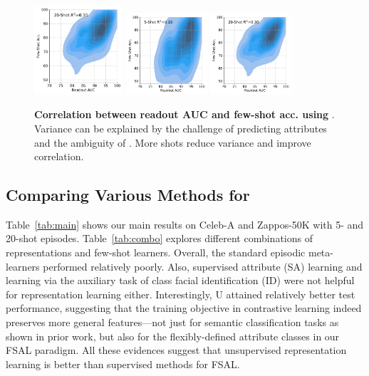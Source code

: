 \begin{figure}[t]
\begin{minipage}[b]{0.49\textwidth}
\quad
\includegraphics[height=3.3cm]{figures/test-s20.pdf}
\else
\includegraphics[height=3.0cm]{figures/test-s5.pdf}
\quad
\includegraphics[height=3.0cm]{figures/test-s20.pdf}
\fi
\vspace{-0.08in}\savespacebeforesection
\caption{\textbf{Correlation between readout AUC and few-shot acc. using \uftsa}. Variance can be explained by the challenge of predicting attributes
and the ambiguity of \taskname{}. More shots reduce variance and improve correlation.}
\label{fig:corr}
\end{minipage}
\vspace{-0.15in}
\end{figure}

\fi



\savespacebeforesection
\subsection{Comparing Various Methods for \taskname{}}
\savespacebeforesection
\label{sec:experiments:results}

Table~\ref{tab:main} shows our main results on Celeb-A and Zappos-50K with 5-
and 20-shot episodes. Table~\ref{tab:combo} explores different combinations of
representations and few-shot learners. Overall, the standard episodic
meta-learners performed relatively poorly. Also, supervised attribute (SA)
learning and learning via the auxiliary task of class facial identification
(ID) were not helpful for representation learning either. Interestingly, U
attained relatively better test performance, suggesting that the training
objective in contrastive learning indeed preserves more general features---not
just for semantic classification tasks as shown in prior work, but also for the
flexibly-defined attribute classes in our FSAL paradigm. All these evidences suggest that unsupervised representation learning is better than supervised methods for FSAL. 

